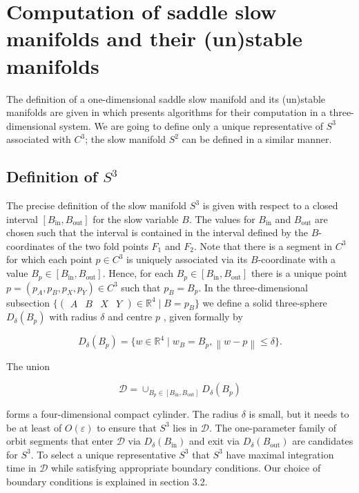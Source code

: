 \documentclass{ws-ijbc}
\begin{document}
 \section{Computation of saddle slow manifolds and their (un)stable manifolds}
    
The definition of a one-dimensional saddle slow manifold and its (un)stable manifolds are given in \cite{Saeed_Paper} which presents algorithms for their computation in a three-dimensional system.  We are going to define only a unique representative of $S^3$ associated with $C^3$; the slow manifold $S^2$ can be defined in a similar manner.

\subsection{Definition of $S^3$}    
The precise definition of the slow manifold $S^3$ is given with respect to a closed interval $[B_{\mathrm{in}},B_{\mathrm{out}}]$ for the slow variable $B$.  The values for $B_{\mathrm{in}}$ and $B_{\mathrm{out}}$ are chosen such that the interval is contained in the interval defined by the $B$-coordinates of the two fold points $F_1$ and $F_2$.  Note that there is a segment in $C^3$ for which each point $p \in C^3$ is uniquely associated via its $B$-coordinate with a value $B_p \in [B_{\mathrm{in}},B_{\mathrm{out}}]$.  Hence, for each $B_p \in [B_{\mathrm{in}},B_{\mathrm{out}}]$ there is a unique point $p=(p_A,p_B,p_X,p_Y) \in C^3$ such that $p_B = B_p$.  In the three-dimensional subsection $\{ \begin{pmatrix} A & B & X & Y \end{pmatrix} \in \mathbb{R}^4 \; | \; B=p_B\}$ we define a solid three-sphere $D_\delta(B_p)$ with radius $\delta$ and centre $p$ , given formally by

\begin{equation*}
D_\delta(B_p)=\{w \in \mathbb{R}^4 \; | \; w_B = B_p, \left\lVert w-p \right\rVert \leq \delta\}.
\end{equation*}
    
\noindent
The union 

\begin{equation*}
\mathscr{D} = \cup_{B_p \in [B_{\mathrm{in}}, B_{\mathrm{out}}]} D_\delta(B_p) 
\end{equation*}

\noindent
forms a four-dimensional compact cylinder.  The radius $\delta$ is small, but it needs to be at least of $O(\varepsilon)$ to ensure that $S^3$ lies in $\mathscr{D}$.  The one-parameter family of orbit segments that enter $\mathscr{D}$ via $D_\delta(B_{\mathrm{in}})$ and exit via $D_\delta(B_{\mathrm{out}})$ are candidates for $S^3$.   To select a unique representative $S^3$ that $S^3$ have maximal integration time in $\mathscr{D}$ while satisfying appropriate boundary conditions.  Our choice of boundary conditions is explained in section 3.2.
    
\end{document}

